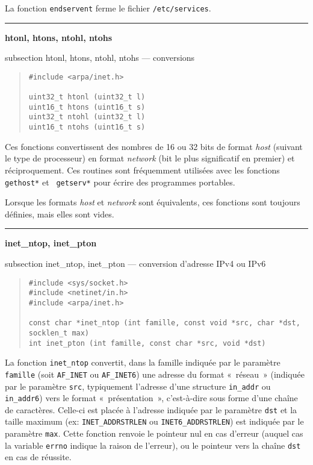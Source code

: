 \documentclass [twoside] {report}
\newcommand {\primitive} [1]
    {
	\phantomsection
	{\large \bf #1}
	\addcontentsline {toc} {subsection} {#1}
    }
\newcommand {\separation}
    {
	\vspace {5mm}
	\nopagebreak
	\hrule
    }
\begin{document}
La fonction {\tt endservent} ferme le fichier {\tt /etc/services}.


\separation
\primitive {htonl, htons, ntohl, ntohs} --- conversions

\begin {quote}
\begin {verbatim}
#include <arpa/inet.h>

uint32_t htonl (uint32_t l)
uint16_t htons (uint16_t s)
uint32_t ntohl (uint32_t l)
uint16_t ntohs (uint16_t s)
\end{verbatim}
\end {quote}

Ces fonctions convertissent des nombres de 16 ou 32 bits de format {\em
host} (suivant le type de processeur) en format {\em network} (bit le
plus significatif en premier) et réciproquement.  Ces routines sont
fréquemment utilisées avec les fonctions {\tt gethost*} et {\tt
getserv*} pour écrire des programmes portables.

Lorsque les formats {\em host} et {\em network} sont équivalents, ces
fonctions sont toujours définies, mais elles sont vides.


\separation
\primitive {inet\_ntop, inet\_pton} --- conversion d'adresse IPv4 ou IPv6

\begin {quote}
\begin {verbatim}
#include <sys/socket.h>
#include <netinet/in.h>
#include <arpa/inet.h>

const char *inet_ntop (int famille, const void *src, char *dst, socklen_t max)
int inet_pton (int famille, const char *src, void *dst)
\end{verbatim}
\end {quote}

La fonction \texttt {inet\_ntop} convertit, dans la famille indiquée
par le paramètre \texttt {famille} (soit \texttt {AF\_INET} ou
\texttt {AF\_INET6}) une adresse du format «~réseau~» (indiquée par
le paramètre \texttt {src}, typiquement l'adresse d'une structure
\texttt {in\_addr} ou \texttt {in\_addr6}) vers le format
«~présentation~», c'est-à-dire sous forme d'une chaîne de caractères.
Celle-ci est placée à l'adresse indiquée par le paramètre \texttt
{dst} et la taille maximum (ex: \texttt {INET\_ADDRSTRLEN} ou \texttt
{INET6\_ADDRSTRLEN}) est indiquée par le paramètre \texttt {max}.
Cette fonction renvoie le pointeur nul en cas d'erreur (auquel cas
la variable \texttt {errno} indique la raison de l'erreur), ou le
pointeur vers la chaîne \texttt {dst} en cas de réussite.
\end{document}
